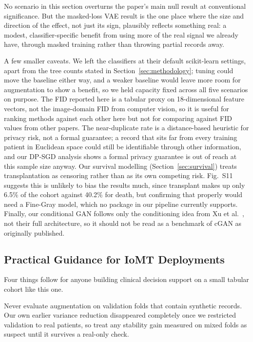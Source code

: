 \documentclass[journal]{IEEEtran}
\begin{document}
No scenario in this section overturns the paper's main null result at conventional significance. But the masked-loss VAE result is the one place where the size and direction of the effect, not just its sign, plausibly reflects something real: a modest, classifier-specific benefit from using more of the real signal we already have, through masked training rather than throwing partial records away.

A few smaller caveats. We left the classifiers at their default scikit-learn settings, apart from the tree counts stated in Section~\ref{sec:methodology}; tuning could move the baseline either way, and a weaker baseline would leave more room for augmentation to show a benefit, so we held capacity fixed across all five scenarios on purpose. The FID reported here is a tabular proxy on 18-dimensional feature vectors, not the image-domain FID from computer vision, so it is useful for ranking methods against each other here but not for comparing against FID values from other papers. The near-duplicate rate is a distance-based heuristic for privacy risk, not a formal guarantee; a record that sits far from every training patient in Euclidean space could still be identifiable through other information, and our DP-SGD analysis shows a formal privacy guarantee is out of reach at this sample size anyway. Our survival modelling (Section~\ref{sec:survival}) treats transplantation as censoring rather than as its own competing risk. Fig.~S11 suggests this is unlikely to bias the results much, since transplant makes up only 6.5\% of the cohort against 40.2\% for death, but confirming that properly would need a Fine-Gray model, which no package in our pipeline currently supports. Finally, our conditional GAN follows only the conditioning idea from Xu et al.\ \cite{xu2019}, not their full architecture, so it should not be read as a benchmark of cGAN as originally published.

\subsection{Practical Guidance for IoMT Deployments}

Four things follow for anyone building clinical decision support on a small tabular cohort like this one.

Never evaluate augmentation on validation folds that contain synthetic records. Our own earlier variance reduction disappeared completely once we restricted validation to real patients, so treat any stability gain measured on mixed folds as suspect until it survives a real-only check.
\end{document}
